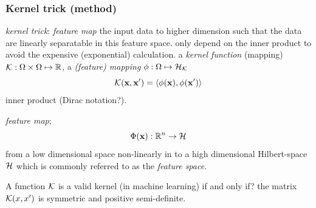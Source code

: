 \subsubsection*{Kernel trick (method)}
\emph{kernel trick}: \emph{feature map} the input data to higher dimension such that the data are linearly separatable in this feature space.
only depend on the inner product to avoid the expensive (exponential) calculation.
a \emph{kernel function} (mapping) $\mathcal{K}: \Omega\times\Omega\mapsto\mathbb{R}$,
a \emph{(feature) mapping} $\phi:\Omega\mapsto\mathcal{H}_{\mathcal{K}}$
\begin{equation}
	\mathcal{K}(\vb{x},\vb{x}') = \langle \phi(\vb{x}),\phi(\vb{x}') \rangle
\end{equation}
inner product (Dirac notation?).
\begin{definition}\label{def:feature_map_classical}
	\emph{feature map};
	\begin{equation}
		\Phi(\vb{x}) : \mathbb{R}^n \to \mathcal{H}
	\end{equation}
	from a low dimensional space non-linearly in to a high dimensional Hilbert-space $\mathcal{H}$ which is commonly referred to as the \emph{feature space}.
\end{definition}
\begin{definition}\label{def:kernel}
	A function $\mathcal{K}$ is a valid kernel (in machine learning) if and only if? the matrix $\mathcal{K}(x,x')$ is symmetric and positive semi-definite.
\end{definition}
